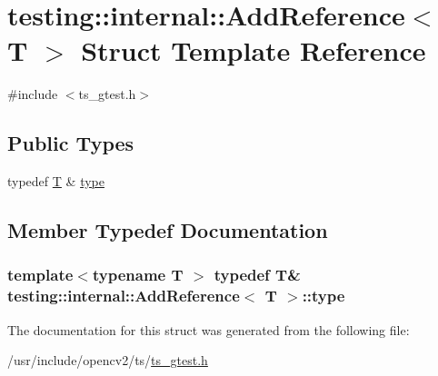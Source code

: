 \hypertarget{structtesting_1_1internal_1_1AddReference}{\section{testing\-:\-:internal\-:\-:Add\-Reference$<$ T $>$ Struct Template Reference}
\label{structtesting_1_1internal_1_1AddReference}
}


{\ttfamily \#include $<$ts\-\_\-gtest.\-h$>$}

\subsection*{Public Types}
\begin{DoxyCompactItemize}
\item 
typedef \hyperlink{calib3d_8hpp_a3efb9551a871ddd0463079a808916717}{T} \& \hyperlink{structtesting_1_1internal_1_1AddReference_a2df8dd7c4e41f6390e6e66b1a9a67bb4}{type}
\end{DoxyCompactItemize}


\subsection{Member Typedef Documentation}
\hypertarget{structtesting_1_1internal_1_1AddReference_a2df8dd7c4e41f6390e6e66b1a9a67bb4}{
\subsubsection[{type}]{\setlength{\rightskip}{0pt plus 5cm}template$<$typename T $>$ typedef {\bf T}\& {\bf testing\-::internal\-::\-Add\-Reference}$<$ {\bf T} $>$\-::{\bf type}}}\label{structtesting_1_1internal_1_1AddReference_a2df8dd7c4e41f6390e6e66b1a9a67bb4}


The documentation for this struct was generated from the following file\-:\begin{DoxyCompactItemize}
\item 
/usr/include/opencv2/ts/\hyperlink{ts__gtest_8h}{ts\-\_\-gtest.\-h}\end{DoxyCompactItemize}

